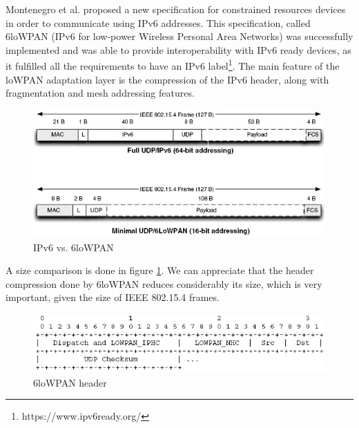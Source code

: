 Montenegro et al. proposed a new specification\cite{rfc4944} for constrained resources devices in order to communicate using IPv6 addresses.
This specification, called 6loWPAN (IPv6 for low-power Wireless Personal Area Networks) was successfully implemented\cite{durvy08making} and was able to provide interoperability with IPv6 ready devices, as it fulfilled all the requirements to have an IPv6 label\footnote{https://www.ipv6ready.org/}.
The main feature of the loWPAN adaptation layer is the compression of the IPv6 header, along with fragmentation and mesh addressing features.

\begin{figure}[htb]
	\centering
	\includegraphics[width=1\columnwidth]{chapters/background.images/6lowpanvsipv6.jpg}
	\caption{IPv6 vs. 6loWPAN \cite{shelby2010embedded}}
	\label{fig:IPv6vs6loWPAN}
\end{figure}

A size comparison is done in figure \ref{fig:IPv6vs6loWPAN}.
We can appreciate that the header compression done by 6loWPAN reduces considerably its size, which is very important, given the size of IEEE 802.15.4 frames.

\begin{figure}[htb]
	\centering
	\includegraphics[width=1\columnwidth]{chapters/background.images/6lowpanDetails.jpg}
	\caption{6loWPAN header}
	\label{fig:6loWPANmin}
\end{figure}


